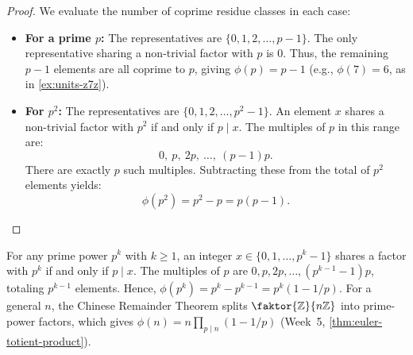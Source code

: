\begin{content}


\begin{proof}
We evaluate the number of coprime residue classes in each case:
\begin{itemize}
    \item \textbf{For a prime $p$:} The representatives are $\{0, 1, 2, \dots, p - 1\}$. The only representative sharing a non-trivial factor with $p$ is $0$. Thus, the remaining $p - 1$ elements are all coprime to $p$, giving $\phi(p) = p - 1$ (e.g., $\phi(7) = 6$, as in \cref{ex:units-z7z}).
    \item \textbf{For $p^2$:} The representatives are $\{0, 1, 2, \dots, p^2 - 1\}$. An element $x$ shares a non-trivial factor with $p^2$ if and only if $p \mid x$. The multiples of $p$ in this range are:
    \[
    0, \ p, \ 2p, \ \dots, \ (p - 1)p.
    \]
    There are exactly $p$ such multiples. Subtracting these from the total of $p^2$ elements yields:
    \[
    \phi(p^2) = p^2 - p = p(p - 1).
    \]
\end{itemize}
\end{proof}

\begin{steps}
For any prime power $p^k$ with $k \ge 1$, an integer $x \in \{0, 1, \dots, p^k - 1\}$ shares a factor with $p^k$ if and only if $p \mid x$. The multiples of $p$ are $0, p, 2p, \dots, (p^{k-1}-1)p$, totaling $p^{k-1}$ elements. Hence, $\phi(p^k) = p^k - p^{k-1} = p^k (1 - 1/p)$. For a general $n$, the Chinese Remainder Theorem splits $\faktor{\mathbb{Z}}{n\mathbb{Z}}$ into prime-power factors, which gives $\phi(n) = n \prod_{p \mid n} (1 - 1/p)$ (Week~5, \cref{thm:euler-totient-product}).
\end{steps}
\end{content}

